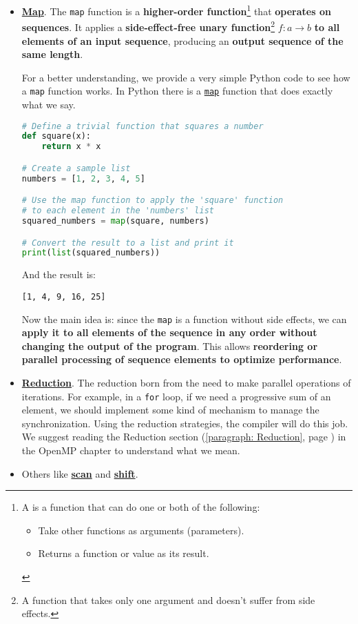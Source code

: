 \begin{itemize}
    \item \textbf{\underline{Map}}. The \texttt{map} function is a \textbf{higher-order function}\footnote{%
        A  is a function that can do one or both of the following:
        \begin{itemize}
            \item Take other functions as arguments (parameters).
            \item Returns a function or value as its result.
        \end{itemize}
    } that \textbf{operates on sequences}. It applies a \textbf{side-effect-free unary function}\footnote{%
        A function that takes only one argument and doesn't suffer from side effects.
    } $f : a \rightarrow b$ \textbf{to all elements of an input sequence}, producing an \textbf{output sequence of the same length}.
    \begin{examplebox}
        For a better understanding, we provide a very simple Python code to see how a \texttt{map} function works. In Python there is a \href{https://docs.python.org/3/library/functions.html#map}{\texttt{map}} function that does exactly what we say.
        \begin{lstlisting}[language=Python]
# Define a trivial function that squares a number
def square(x):
    return x * x

# Create a sample list
numbers = [1, 2, 3, 4, 5]

# Use the map function to apply the 'square' function
# to each element in the 'numbers' list
squared_numbers = map(square, numbers)

# Convert the result to a list and print it
print(list(squared_numbers))\end{lstlisting}
        And the result is:
        \begin{lstlisting}
[1, 4, 9, 16, 25]\end{lstlisting}
    \end{examplebox}

    Now the main idea is: since the \texttt{map} is a function without side effects, we can \textbf{apply it to all elements of the sequence in any order without changing the output of the program}. This allows \textbf{reordering or parallel processing of sequence elements to \textcolor{Green4}{\textbf{optimize performance}}}.
    
    \item \textbf{\underline{Reduction}}. The reduction born from the need to make parallel operations of iterations. For example, in a \texttt{for} loop, if we need a progressive sum of an element, we should implement some kind of mechanism to manage the synchronization. Using the reduction strategies, the compiler will do this job. We suggest reading the Reduction section (\ref{paragraph: Reduction}, page \pageref{paragraph: Reduction}) in the OpenMP chapter to understand what we mean.
    
    \item Others like \textbf{\underline{scan}} and \textbf{\underline{shift}}.
\end{itemize}